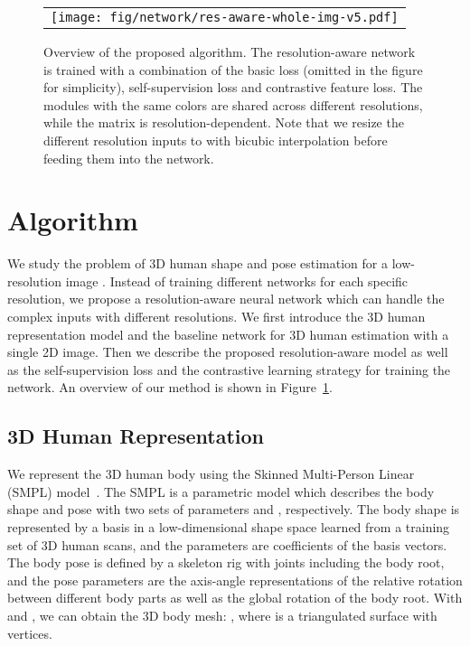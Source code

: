 \documentclass[runningheads]{llncs}
\begin{document}
\begin{figure}[t]
\begin{center}
		\begin{tabular}{c}
\texttt{[image: fig/network/res-aware-whole-img-v5.pdf]} \\
\end{tabular}
	\end{center}
\caption{Overview of the proposed algorithm. The resolution-aware network  is trained with a combination of the basic loss (omitted in the figure for simplicity), self-supervision loss and contrastive feature loss. The modules with the same colors are shared across different resolutions, while the matrix  is resolution-dependent. Note that we resize  the different resolution inputs  to  with bicubic interpolation before feeding them into the network.
	}
	\label{fig:resolution-aware network}
\end{figure}


\section{Algorithm}
We study the problem of 3D human shape and pose estimation for a low-resolution image .
Instead of training different networks for each specific resolution, we propose a resolution-aware neural network  which can handle the complex inputs with different resolutions.
We first introduce the 3D human representation model and the baseline network for 3D human estimation with a single 2D image.
Then we describe the proposed resolution-aware model as well as the self-supervision loss and the contrastive learning strategy for training the network.
An overview of our method is shown in Figure~\ref{fig:resolution-aware network}.


\subsection{3D Human Representation}
We represent the 3D human body using the Skinned Multi-Person Linear (SMPL) model~\cite{loper2015smpl}.
The SMPL is a parametric model which describes the body shape and pose with two sets of parameters  and , respectively. 
The body shape is represented by a basis in a low-dimensional shape space learned from a training set of 3D human scans, and the parameters  are coefficients of the basis vectors.
The body pose is defined by a skeleton rig with  joints including the body root, and the pose parameters  are the axis-angle representations of the relative rotation between different body parts as well as the global rotation of the body root.
With  and , we can obtain the 3D body mesh: , where  is a triangulated surface with  vertices.
\end{document}
